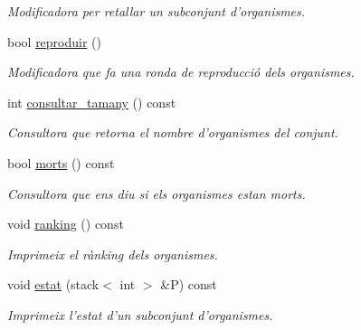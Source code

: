 \begin{DoxyCompactItemize}
\begin{DoxyCompactList}\small\item\em Modificadora per retallar un subconjunt d'organismes. \end{DoxyCompactList}\item 
bool \hyperlink{class_conjunt_org_aebaf39d27e44ef884ce4dfa4f7778754}{reproduir} ()
\begin{DoxyCompactList}\small\item\em Modificadora que fa una ronda de reproducció dels organismes. \end{DoxyCompactList}\item 
int \hyperlink{class_conjunt_org_adbce2716cb543fa4d513c6d2a21b4fe1}{consultar\-\_\-tamany} () const 
\begin{DoxyCompactList}\small\item\em Consultora que retorna el nombre d'organismes del conjunt. \end{DoxyCompactList}\item 
bool \hyperlink{class_conjunt_org_aa250202ccc4d06ead8b11c9b26c2f28d}{morts} () const 
\begin{DoxyCompactList}\small\item\em Consultora que ens diu si els organismes estan morts. \end{DoxyCompactList}\item 
void \hyperlink{class_conjunt_org_ad5e4d411aa4bd0287411d20c6d79d08e}{ranking} () const 
\begin{DoxyCompactList}\small\item\em Imprimeix el rànking dels organismes. \end{DoxyCompactList}\item 
void \hyperlink{class_conjunt_org_a70a707c8a9c7249e972470a41feebc36}{estat} (stack$<$ int $>$ \&P) const 
\begin{DoxyCompactList}\small\item\em Imprimeix l'estat d'un subconjunt d'organismes. \end{DoxyCompactList}\end{DoxyCompactItemize}

